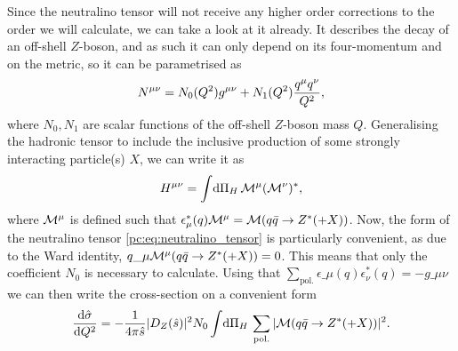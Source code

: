 \documentclass[../main.tex]{subfiles}
\begin{document}
Since the neutralino tensor will not receive any higher order corrections to the order we will calculate, we can take a look at it already.
It describes the decay of an off-shell \(Z\)-boson, and as such it can only depend on its four-momentum and on the metric, so it can be parametrised as
\begin{equation}
  \label{pc:eq:neutralino_tensor}
  N\^{\mu\nu} = N_0(Q^2) \g + N_1(Q^2) \frac{q\^\mu q\^\nu}{Q^2},
\end{equation}
where \(N_0, N_1\) are scalar functions of the off-shell \(Z\)-boson mass \(Q\).
Generalising the hadronic tensor to include the inclusive production of some strongly interacting particle(s) \(X\), we can write it as
\begin{equation}
  H\^{\mu\nu} = \integral{\Pi_H} \M\^\mu (\M\^\nu)^\ast,
\end{equation}
where \(\M\^\mu\) is defined such that \(\epsilon^\ast_\mu(q) \M\^\mu = \M(q\bar{q} \to Z^\ast (+ X))\).
Now, the form of the neutralino tensor \cref{pc:eq:neutralino_tensor} is particularly convenient, as due to the Ward identity, \(q\_\mu \M\^\mu(q\bar{q} \to Z^\ast (+ X)) = 0\).
This means that only the coefficient \(N_0\) is necessary to calculate.
Using that \(\sum_\text{pol.} \epsilon\_\mu(q) \epsilon_\nu^\ast(q) = -g\_{\mu\nu}\) we can then write the cross-section on a convenient form
\begin{equation}
  \label{pc:eq:dsigma_dQ2_1}
  \d[Q^2]{\hat\sigma} = -\frac{1}{4\pi \hat{s}} |D_Z(\hat{s})|^2 N_0 \integral{\Pi_H} \sum_\text{pol.}|\M(q\bar{q} \to Z^\ast (+ X))|^2.
\end{equation}
\end{document}
